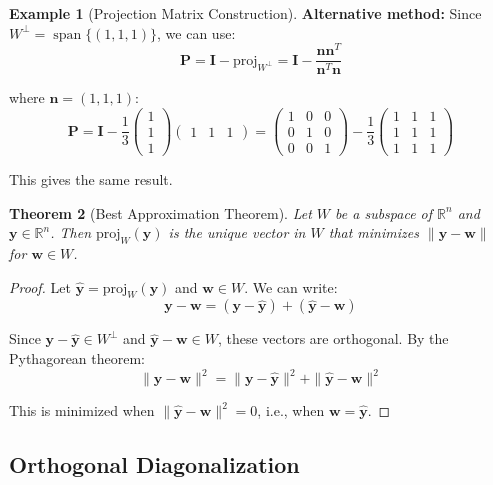 \documentclass[12pt]{article}
\numberwithin{equation}{section}
\newcommand{\vect}[1]{\boldsymbol{#1}}   %
\newcommand{\mat}[1]{\mathbf{#1}}        %
\newcommand{\Span}{\operatorname{span}}
\theoremstyle{plain}
\newtheorem{theorem}{Theorem}[section]
\theoremstyle{definition}
\newtheorem{example}[theorem]{Example}
\theoremstyle{remark}
\begin{document}
\begin{example}[Projection Matrix Construction]
\textbf{Alternative method:} Since $W^{\perp} = \Span\{(1, 1, 1)\}$, we can use:
$$\mat{P} = \mat{I} - \text{proj}_{W^{\perp}} = \mat{I} - \frac{\vect{n}\vect{n}^T}{\vect{n}^T\vect{n}}$$

where $\vect{n} = (1, 1, 1)$:
$$\mat{P} = \mat{I} - \frac{1}{3}\begin{pmatrix} 1 \\ 1 \\ 1 \end{pmatrix}\begin{pmatrix} 1 & 1 & 1 \end{pmatrix} = \begin{pmatrix} 1 & 0 & 0 \\ 0 & 1 & 0 \\ 0 & 0 & 1 \end{pmatrix} - \frac{1}{3}\begin{pmatrix} 1 & 1 & 1 \\ 1 & 1 & 1 \\ 1 & 1 & 1 \end{pmatrix}$$

This gives the same result.
\end{example}

\begin{theorem}[Best Approximation Theorem]
Let $W$ be a subspace of $\mathbb{R}^n$ and $\vect{y} \in \mathbb{R}^n$. Then $\text{proj}_W(\vect{y})$ is the unique vector in $W$ that minimizes $\|\vect{y} - \vect{w}\|$ for $\vect{w} \in W$.
\end{theorem}

\begin{proof}
Let $\hat{\vect{y}} = \text{proj}_W(\vect{y})$ and $\vect{w} \in W$. We can write:
$$\vect{y} - \vect{w} = (\vect{y} - \hat{\vect{y}}) + (\hat{\vect{y}} - \vect{w})$$

Since $\vect{y} - \hat{\vect{y}} \in W^{\perp}$ and $\hat{\vect{y}} - \vect{w} \in W$, these vectors are orthogonal. By the Pythagorean theorem:
$$\|\vect{y} - \vect{w}\|^2 = \|\vect{y} - \hat{\vect{y}}\|^2 + \|\hat{\vect{y}} - \vect{w}\|^2$$

This is minimized when $\|\hat{\vect{y}} - \vect{w}\|^2 = 0$, i.e., when $\vect{w} = \hat{\vect{y}}$.
\end{proof}

\subsection{Orthogonal Diagonalization}
\end{document}
